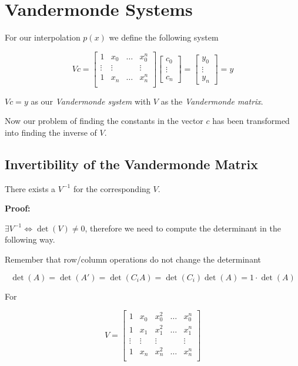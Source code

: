 \section{Vandermonde Systems}

For our interpolation \(p(x)\) we define the following system 

\[
    Vc 
    =
    \begin{bmatrix}
        1 & x_0 & \dots & x_0^n \\ 
        \vdots & \vdots &  & \vdots \\ 
        1 & x_n & \dots & x_n^n \\ 
    \end{bmatrix}
    \begin{bmatrix}
        c_0 \\ 
        \vdots \\ 
        c_n
    \end{bmatrix}
    = 
    \begin{bmatrix}
        y_0 \\ 
        \vdots \\ 
        y_n
    \end{bmatrix}
    = y
\]

\(Vc = y\) as our \emph{Vandermonde system} with \(V\) as the \emph{Vandermonde matrix}.

Now our problem of finding the constants in the vector \(c\) has been transformed into finding the inverse of \(V\).

\subsection{Invertibility of the Vandermonde Matrix}

There exists a \(V^{-1}\) for the corresponding \(V\).

\textbf{Proof:}

\(\exists V^{-1} \iff \det(V) \ne 0\), therefore we need to compute the determinant in the following way.

Remember that row/column operations do not change the determinant 

\[
    \det(A) = \det(A')  =\det(C_i A) = \det(C_i)\det(A) = 1 \cdot \det(A)
\]

For 

\[
    V = 
    \begin{bmatrix}
        1 & x_0 & x_0^2 & \dots & x_0^n \\ 
        1 & x_1 & x_1^2 & \dots & x_1^n \\ 
        \vdots &  \vdots & \vdots&  & \vdots \\ 
        1 & x_n & x_n^2 & \dots & x_n^n \\ 
    \end{bmatrix}
\]

